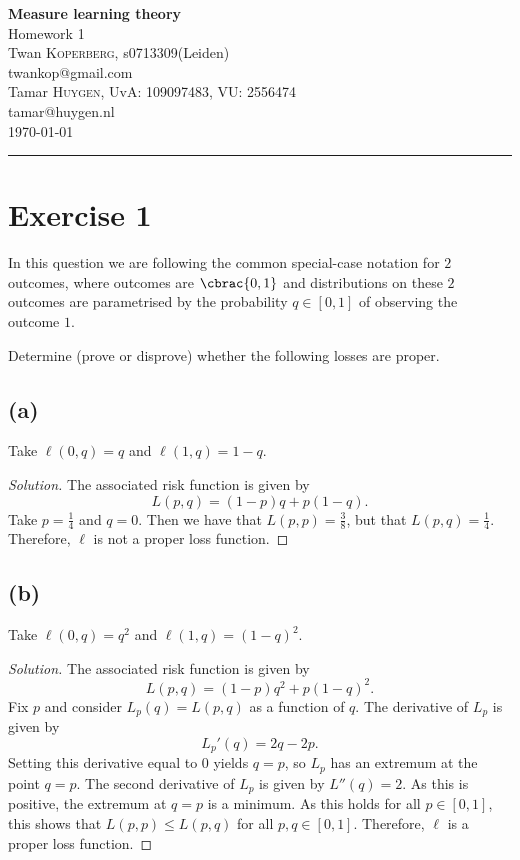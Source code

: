 \documentclass[10pt, a4paper, twoside]{amsart}
\makeatletter
\DeclarePairedDelimiter\cbrac\{\}
\newenvironment{solution}
               {\let\oldqedsymbol=\qedsymbol
                \renewcommand{\qedsymbol}{$\blacktriangleleft$}
                \begin{proof}[Solution]}
               {\end{proof}
                \renewcommand{\qedsymbol}{\oldqedsymbol}}
\newcommand{\firstName}  {Twan}
\newcommand{\lastName}   {Koperberg}
\newcommand{\studId}     {0713309}
\renewcommand{\email}    {twankop@gmail.com}
\makeatother
\begin{document}
\begin{center}
  {\huge\bf Measure learning theory}\\
  {\large\sc Homework 1 }\\ \vspace{1em}
  \firstName \textsc{ \lastName}, {\sc s}\studId (Leiden)\\
  \email\text{}\\ \smallskip
  Tamar \textsc{ Huygen}, UvA: 109097483, VU: 2556474\\
  tamar@huygen.nl \\ \bigskip
  \today \\\bigskip
  \hrule
  \bigskip
\end{center}

\section*{Exercise 1}
In this question we are following the common special-case notation for $2$ outcomes, 
where outcomes are $\cbrac{0, 1}$ and distributions on these $2$ outcomes are parametrised by the probability 
$q \in [0, 1]$ of observing the outcome $1$.

Determine (prove or disprove) whether the following losses are proper.
\subsection*{(a)}
Take $\ell(0,q)=q$ and $\ell(1,q)=1-q$.
\begin{solution}
The associated risk function is given by
\begin{equation*}
L(p,q)=(1-p)q+p(1-q).
\end{equation*}
Take $p=\tfrac{1}{4}$ and $q=0$. Then we have that $L(p,p)=\tfrac{3}{8}$, but that $L(p,q)=\tfrac{1}{4}$.
Therefore, $\ell$ is not a proper loss function.
\end{solution}

\subsection*{(b)}
Take $\ell(0,q)=q^2$ and $\ell(1,q)=(1-q)^2$.
\begin{solution}
The associated risk function is given by
\begin{equation*}
L(p,q)=(1-p)q^2+p(1-q)^2.
\end{equation*}
Fix $p$ and consider $L_p(q)=L(p,q)$ as a function of $q$.
The derivative of $L_p$ is given by
\begin{equation*}
L_p'(q)=2q-2p.
\end{equation*}
Setting this derivative equal to $0$ yields $q=p$, so $L_p$ has an extremum at the point $q=p$.
The second derivative of $L_p$ is given by $L''(q)=2$.
As this is positive, the extremum at $q=p$ is a minimum. 
As this holds for all $p \in [0,1]$, this shows that $L(p,p) \leq L(p,q)$ for all $p,q \in [0,1]$.
Therefore, $\ell$ is a proper loss function.
\end{solution}
\end{document}
